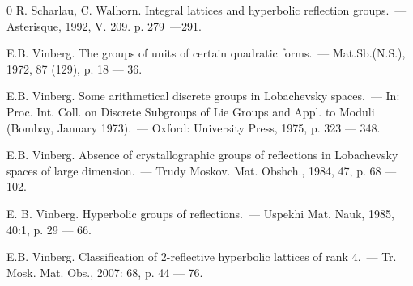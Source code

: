 \documentclass[14pt]{article}
\begin{document}
\begin{thebibliography}{0}
R. Scharlau, C. Walhorn. Integral lattices and hyperbolic
reflection groups.~--- Asterisque, 1992, V. 209. p. 279~---291.


E.B. Vinberg. The groups of units of certain quadratic forms.~--- Mat.Sb.(N.S.), 1972, 87 
(129), p. 18 --- 36.

E.B. Vinberg. Some arithmetical discrete groups in Lobachevsky
spaces.~--- In: Proc.
Int. Coll. on Discrete Subgroups of Lie Groups and Appl. to Moduli (Bombay,
January 1973).~--- Oxford: University Press, 1975, p. 323 --- 348.

E.B. Vinberg. Absence of crystallographic groups of reflections in Lobachevsky spaces of large
dimension.~--- Trudy Moskov. Mat. Obshch.,  1984, 47, p. 68 --- 102.

E. B. Vinberg. Hyperbolic groups of reflections.~--- Uspekhi Mat. Nauk, 1985, 40:1,
p. 29 --- 66.

E.B. Vinberg. Classification of $2$-reflective hyperbolic lattices of rank $4$.~---
Tr. Mosk. Mat. Obs., 2007: 68, p. 44 --- 76.


\end{thebibliography}
\end{document}
